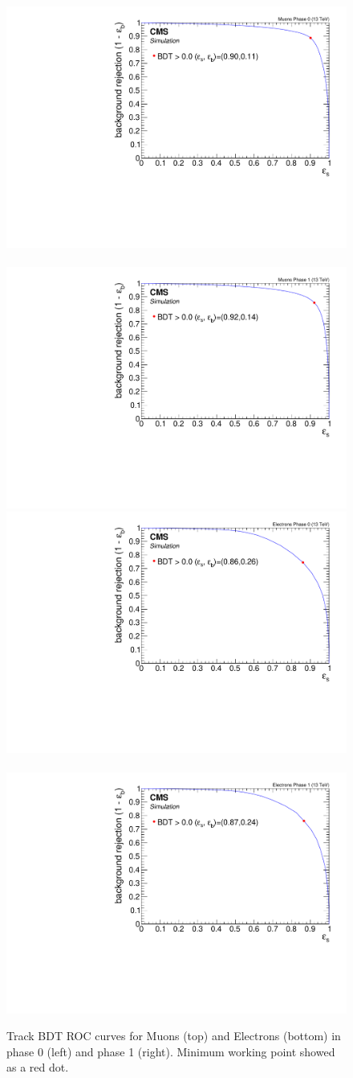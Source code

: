 \begin{figure}[!htb]
\centering
\includegraphics[width=0.48\linewidth]{plots/track_bdt/roc_Tracks_Muons_Phase_0.pdf} \,
\includegraphics[width=0.48\linewidth]{plots/track_bdt/roc_Tracks_Muons_Phase_1.pdf}  \\
\includegraphics[width=0.48\linewidth]{plots/track_bdt/roc_Tracks_Electrons_Phase_0.pdf} \,
\includegraphics[width=0.48\linewidth]{plots/track_bdt/roc_Tracks_Electrons_Phase_1.pdf} \\
\caption[Track BDT ROC curves]{Track BDT ROC curves for Muons (top) and Electrons (bottom) in phase 0 (left) and phase 1 (right). Minimum working point showed as a red dot.}
\label{fig:track-bdt-roc}
\end{figure}

